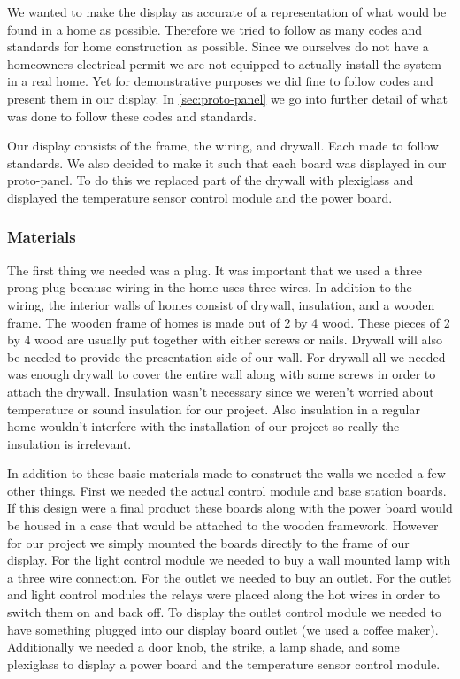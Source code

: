 We wanted to make the display as accurate of a representation of
what would be found in a home as possible. Therefore we tried to follow as
many codes and standards for home construction as possible. Since we ourselves
do not have a homeowners electrical permit we are not equipped to actually
install the system in a real home. Yet for demonstrative purposes we did
fine to follow codes and present them in our display. In \autoref{sec:proto-panel}
we go into further detail of what was done to follow these codes and
standards.

Our display consists of the frame, the wiring, and drywall.
Each made to follow standards. We also decided to make it such that each board was displayed in our proto-panel. To do this we replaced part of the drywall with plexiglass and displayed the temperature sensor control module and the power board.   

\subsubsection{Materials}
The first thing we needed was a plug. It was important that we used a three prong
plug because wiring in the home uses three wires. In addition to the wiring, the
interior walls of homes consist of drywall, insulation, and a wooden frame. The
wooden frame of homes is made out of 2 by 4 wood. These pieces of 2 by 4 wood
are usually put together with either screws or nails. Drywall will also be
needed to provide the presentation side of our wall. For drywall all we
needed was enough drywall to cover the entire wall along with some screws
in order to attach the drywall. Insulation wasn't necessary since we
weren{}'t worried about temperature or sound insulation for our project. Also
insulation in a regular home wouldn{}'t interfere with the installation of our
project so really the insulation is irrelevant.

In addition to these basic materials made to construct the walls
we needed a few other things. First we needed the actual control module
and base station boards. If this design were a final product these boards along with the power board would be housed
in a case that would be attached to the wooden framework. However for our project we simply mounted the boards directly to the frame of our display. For the light control
module we needed to buy a wall mounted lamp with a three wire connection. For the
outlet we needed to buy an outlet. For the outlet and light
control modules the relays were  placed along the hot wires in order to
switch them on and back off. To display the outlet control module we needed
to have something plugged into our display board outlet (we used a
coffee maker). Additionally we needed a door knob,
the strike, a lamp shade, and some plexiglass to display a power board and the temperature sensor control module.


